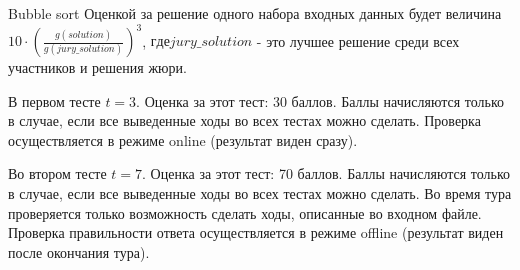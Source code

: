 \begin{problem}{Bubble sort}{}{}{}
Оценкой за решение одного набора входных данных будет величина $10\cdot \left(\frac{g(solution)}{g(jury\_solution)}\right)^3$, $где jury\_solution$ - это лучшее решение среди всех участников и решения жюри.

В первом тесте $t = 3$. Оценка за этот тест: 30 баллов. Баллы начисляются только в случае, если все выведенные ходы во всех тестах можно сделать. Проверка осуществляется в режиме online (результат виден сразу).

Во втором тесте $t = 7$. Оценка за этот тест: 70 баллов. Баллы начисляются только в случае, если все выведенные ходы во всех тестах можно сделать. Во время тура проверяется только возможность сделать ходы, описанные во входном файле. Проверка правильности ответа осуществляется в режиме offline (результат виден после окончания тура).

\Examples
\begin{example}
%
\end{example}

\end{problem}

